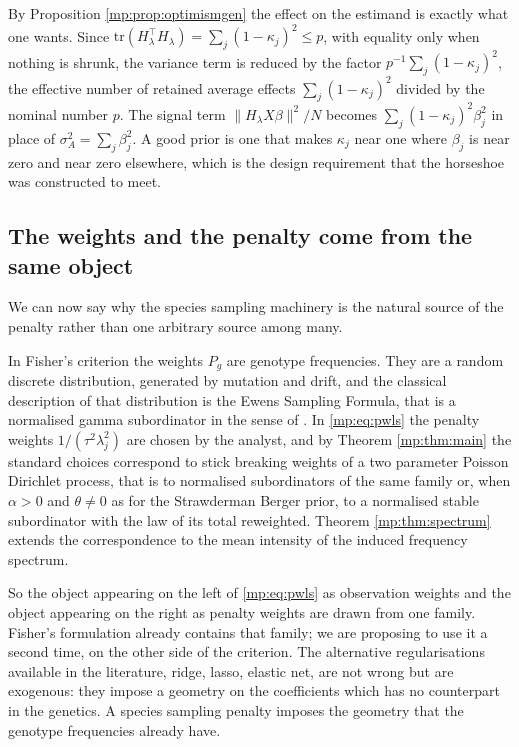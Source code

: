 By Proposition \ref{mp:prop:optimismgen} the effect on the estimand is exactly what one wants.
Since $\mathrm{tr}(H_\lambda^\top H_\lambda)=\sum_j(1-\kappa_j)^2 \le p$, with equality only
when nothing is shrunk, the variance term is reduced by the factor
$p^{-1}\sum_j(1-\kappa_j)^2$, the effective number of retained average effects
$\sum_j(1-\kappa_j)^2$ divided by the nominal number $p$. The
signal term $\|H_\lambda X\beta\|^2/N$ becomes $\sum_j(1-\kappa_j)^2\beta_j^2$ in place of
$\sigma_A^2=\sum_j\beta_j^2$. A good
prior is one that makes $\kappa_j$ near one where $\beta_j$ is near zero and near zero
elsewhere, which is the design requirement that the horseshoe was constructed to meet.

\subsection{The weights and the penalty come from the same object}

We can now say why the species sampling machinery is the natural source of the penalty rather
than one arbitrary source among many.

In Fisher's criterion the weights $P_g$ are genotype frequencies. They are a random discrete
distribution, generated by mutation and drift, and the classical description of that
distribution is the Ewens Sampling Formula, that is a normalised gamma subordinator in the
sense of \citet{mp:kingman1975}. In \eqref{mp:eq:pwls} the penalty weights $1/(\tau^2\lambda_j^2)$ are
chosen by the analyst, and by Theorem \ref{mp:thm:main} the standard choices correspond to
stick breaking weights of a two parameter Poisson Dirichlet process, that is to normalised
subordinators of the same family or, when $\alpha>0$ and $\theta\neq0$ as for the Strawderman Berger prior, to a normalised stable subordinator with the law of its total reweighted. Theorem \ref{mp:thm:spectrum} extends the correspondence
to the mean intensity of the induced frequency spectrum.

So the object appearing on the left of \eqref{mp:eq:pwls} as observation weights and the object
appearing on the right as penalty weights are drawn from one family. Fisher's formulation
already contains that family; we are proposing to use it a second time, on the other side of
the criterion. The alternative regularisations available in the literature, ridge, lasso,
elastic net, are not wrong but are exogenous: they impose a geometry on the coefficients
which has no counterpart in the genetics. A species sampling penalty imposes the geometry
that the genotype frequencies already have.

